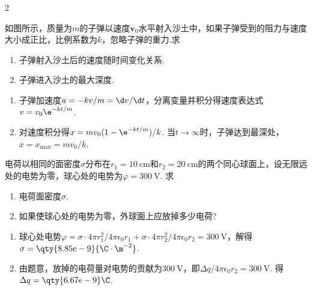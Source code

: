 \begin{paracol}{2}
\begin{problem}
    如图所示，质量为$m$的子弹以速度$\bm v_0$水平射入沙土中，如果子弹受到的阻力与速度大小成正比，比例系数为$k$，忽略子弹的重力.求
    \begin{enumerate}
        \item 子弹射入沙土后的速度随时间变化关系.
        \item 子弹进入沙土的最大深度.
    \end{enumerate}
    \switchcolumn\vspace*{\fill}\centering
    \vspace*{\fill}
\end{problem}    
\end{paracol}
\begin{solution}\leavevmode
    \begin{enumerate}
        \item 子弹加速度$a=-kv/m=\d v/\d t$，分离变量并积分得速度表达式$v=v_0\e^{-kt/m}$.
        \item 对速度积分得$x=mv_0(1-\e^{-kt/m})/k$. 当$t\to\infty$时，子弹达到最深处，$x=x_{\max}=mv_0/k$.
    \end{enumerate}
\end{solution}

\begin{problem}
    电荷以相同的面密度$\sigma$分布在$r_1=\qty{10}\cm$和$r_2=\qty{20}\cm$的两个同心球面上，设无限远处的电势为零，球心处的电势为$\varphi=\qty{300}\V$. 求
    \begin{enumerate}
        \item 电荷面密度$\sigma$.
        \item 如果使球心处的电势为零，外球面上应放掉多少电荷?
    \end{enumerate}
\end{problem}
\begin{solution}\leavevmode
    \begin{enumerate}
        \item 球心处电势$\displaystyle\varphi=\sigma\cdot 4\pi r_1^2/4\pi\epsilon_0r_1+\sigma\cdot 4\pi r_2^2/4\pi\epsilon_0r_2=\qty{300}\V$，解得$\sigma=\qty{8.85e-9}{\C\cdot\m^{-2}}$.
        \item 由题意，放掉的电荷量对电势的贡献为$\qty{300}\V$，即$\Delta q/4\pi\epsilon_0r_2=\qty{300}\V$. 得$\Delta q=\qty{6.67e-9}\C$.
    \end{enumerate}
\end{solution}

